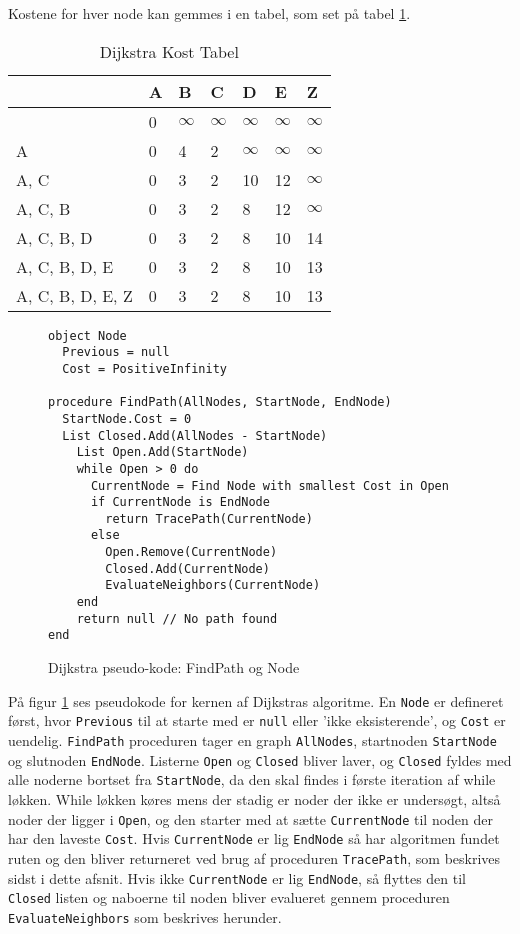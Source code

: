 Kostene for hver node kan gemmes i en tabel, som set på tabel \ref{dijktabel}.
  
\begin{table}[H]
\centering
  \begin{tabular}{|l|l|l|l|l|l|l|}
  \hline
                   & A & B & C & D  & E  & Z  \\ \hline
                   & 0 & $\infty$ & $\infty$ & $\infty$  & $\infty$  & $\infty$  \\ \hline
  A                & 0 & 4 & 2 & $\infty$  & $\infty$  & $\infty$  \\ \hline
  A, C             & 0 & 3 & 2 & 10 & 12 & $\infty$  \\ \hline
  A, C, B          & 0 & 3 & 2 & 8  & 12 & $\infty$  \\ \hline
  A, C, B, D       & 0 & 3 & 2 & 8  & 10 & 14 \\ \hline
  A, C, B, D, E    & 0 & 3 & 2 & 8  & 10 & 13 \\ \hline
  A, C, B, D, E, Z & 0 & 3 & 2 & 8  & 10 & 13 \\ \hline
  \end{tabular}
  \label{dijktabel}
  \caption{Dijkstra Kost Tabel}
\end{table}

\begin{figure}[H]
\begin{lstlisting}
object Node
  Previous = null
  Cost = PositiveInfinity

procedure FindPath(AllNodes, StartNode, EndNode)
  StartNode.Cost = 0
  List Closed.Add(AllNodes - StartNode)
    List Open.Add(StartNode)
    while Open > 0 do
      CurrentNode = Find Node with smallest Cost in Open
      if CurrentNode is EndNode
        return TracePath(CurrentNode)
      else
        Open.Remove(CurrentNode)
        Closed.Add(CurrentNode)
        EvaluateNeighbors(CurrentNode)
    end
    return null // No path found
end
\end{lstlisting}
\caption{Dijkstra pseudo-kode: FindPath og Node}\label{DijkstraCodeFindPathNode}
\end{figure}

På figur \ref{DijkstraCodeFindPathNode} ses pseudokode for kernen af Dijkstras algoritme. En \texttt{Node} er defineret først, hvor \texttt{Previous} til at starte med er \texttt{null} eller 'ikke eksisterende', og \texttt{Cost} er uendelig. \texttt{FindPath} proceduren tager en graph \texttt{AllNodes}, startnoden \texttt{StartNode} og slutnoden \texttt{EndNode}. Listerne \texttt{Open} og \texttt{Closed} bliver laver, og \texttt{Closed} fyldes med alle noderne bortset fra \texttt{StartNode}, da den skal findes i første iteration af while løkken. While løkken køres mens der stadig er noder der ikke er undersøgt, altså noder der ligger i \texttt{Open}, og den starter med at sætte \texttt{CurrentNode} til noden der har den laveste \texttt{Cost}. Hvis \texttt{CurrentNode} er lig \texttt{EndNode} så har algoritmen fundet ruten og den bliver returneret ved brug af proceduren \texttt{TracePath}, som beskrives sidst i dette afsnit. Hvis ikke \texttt{CurrentNode} er lig \texttt{EndNode}, så flyttes den til \texttt{Closed} listen og naboerne til noden bliver evalueret gennem proceduren \texttt{EvaluateNeighbors} som beskrives herunder.


